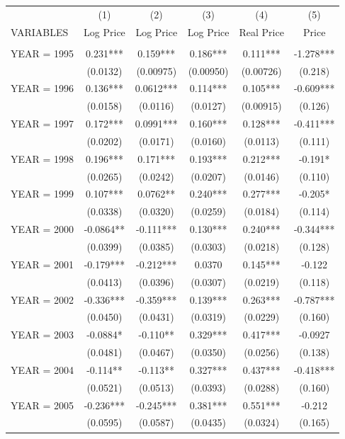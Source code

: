 \begin{tabular}{lccccc} \hline
 & (1) & (2) & (3) & (4) & (5) \\
VARIABLES & Log Price & Log Price & Log Price & Real Price & Price \\ \hline
 &  &  &  &  &  \\
YEAR = 1995 & 0.231*** & 0.159*** & 0.186*** & 0.111*** & -1.278*** \\
 & (0.0132) & (0.00975) & (0.00950) & (0.00726) & (0.218) \\
YEAR = 1996 & 0.136*** & 0.0612*** & 0.114*** & 0.105*** & -0.609*** \\
 & (0.0158) & (0.0116) & (0.0127) & (0.00915) & (0.126) \\
YEAR = 1997 & 0.172*** & 0.0991*** & 0.160*** & 0.128*** & -0.411*** \\
 & (0.0202) & (0.0171) & (0.0160) & (0.0113) & (0.111) \\
YEAR = 1998 & 0.196*** & 0.171*** & 0.193*** & 0.212*** & -0.191* \\
 & (0.0265) & (0.0242) & (0.0207) & (0.0146) & (0.110) \\
YEAR = 1999 & 0.107*** & 0.0762** & 0.240*** & 0.277*** & -0.205* \\
 & (0.0338) & (0.0320) & (0.0259) & (0.0184) & (0.114) \\
YEAR = 2000 & -0.0864** & -0.111*** & 0.130*** & 0.240*** & -0.344*** \\
 & (0.0399) & (0.0385) & (0.0303) & (0.0218) & (0.128) \\
YEAR = 2001 & -0.179*** & -0.212*** & 0.0370 & 0.145*** & -0.122 \\
 & (0.0413) & (0.0396) & (0.0307) & (0.0219) & (0.118) \\
YEAR = 2002 & -0.336*** & -0.359*** & 0.139*** & 0.263*** & -0.787*** \\
 & (0.0450) & (0.0431) & (0.0319) & (0.0229) & (0.160) \\
YEAR = 2003 & -0.0884* & -0.110** & 0.329*** & 0.417*** & -0.0927 \\
 & (0.0481) & (0.0467) & (0.0350) & (0.0256) & (0.138) \\
YEAR = 2004 & -0.114** & -0.113** & 0.327*** & 0.437*** & -0.418*** \\
 & (0.0521) & (0.0513) & (0.0393) & (0.0288) & (0.160) \\
YEAR = 2005 & -0.236*** & -0.245*** & 0.381*** & 0.551*** & -0.212 \\
 & (0.0595) & (0.0587) & (0.0435) & (0.0324) & (0.165) \\

\end{tabular}
